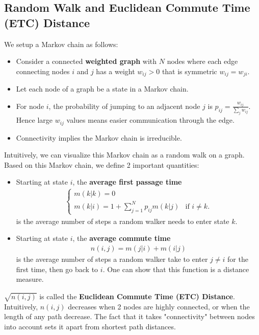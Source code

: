\documentclass[./some_latex_template.tex]{subfiles}
\begin{document}
\subsection{Random Walk and Euclidean Commute Time (ETC) Distance}

We setup a Markov chain as follows:
\begin{itemize}
	\item Consider a connected \textbf{weighted graph} with $N$ nodes where each edge connecting nodes $i$ and $j$ has a weight $w_{ij} > 0$ that is symmetric $w_{ij} = w_{ji}$. 
	\item Let each node of a graph be a state in a Markov chain. 
	\item For node $i$, the probability of jumping to an adjacent node $j$ is $p_{ij} = \frac{w_{ij}}{\sum_{j} w_{ij}}$. Hence large $w_{ij}$ values means easier communication through the edge. 
	\item Connectivity implies the Markov chain is irreducible. 
\end{itemize}

\noindent Intuitively, we can visualize this Markov chain as a random walk on a graph. Based on this Markov chain, we define 2 important quantities: 

\begin{itemize}
	\item Starting at state $i$, the \textbf{average first passage time} \begin{align}\label{eq:m}		
		\begin{cases}
			m(k|k) = 0 \\
			m(k|i) = 1 + \sum_{j=1}^N p_{ij}m(k|j) & \text{if } i\neq k.
		\end{cases}
	\end{align}
	is the average number of steps a random walker needs to enter state $k$.
	\item Starting at state $i$, the \textbf{average commute time} 
	\begin{align*}
		n(i,j) = m(j|i) + m(i|j)
	\end{align*}
	is the average number of steps a random walker take to enter $j \neq i$ for the first time, then go back to $i$. One can show that this function is a distance measure. 
\end{itemize}

\noindent $\sqrt{n(i, j)}$ is called the \textbf{Euclidean Commute Time (ETC) Distance}. Intuitively, $n(i, j)$ decreases when 2 nodes are highly connected, or when the length of any path decrease. The fact that it takes "connectivity" between nodes into account sets it apart from  shortest path distances.
\end{document}
